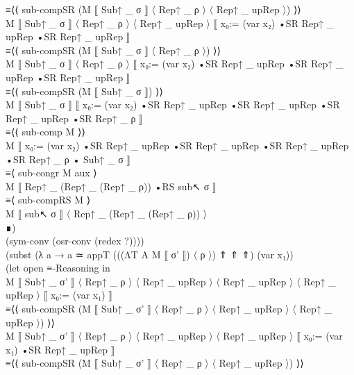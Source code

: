 {\begin{code}
{\>                         ≡⟨⟨ sub-compSR (M ⟦ Sub↑ \_ σ ⟧ 〈 Rep↑ \_ ρ 〉 〈 Rep↑ \_ upRep 〉) ⟩⟩\<\\
\>                           M ⟦ Sub↑ \_ σ ⟧ 〈 Rep↑ \_ ρ 〉 〈 Rep↑ \_ upRep 〉 ⟦ x₀:= (var x₂) •SR Rep↑ \_ upRep •SR Rep↑ \_ upRep ⟧\<\\
\>                         ≡⟨⟨ sub-compSR (M ⟦ Sub↑ \_ σ ⟧ 〈 Rep↑ \_ ρ 〉) ⟩⟩\<\\
\>                           M ⟦ Sub↑ \_ σ ⟧ 〈 Rep↑ \_ ρ 〉 ⟦ x₀:= (var x₂) •SR Rep↑ \_ upRep •SR Rep↑ \_ upRep •SR Rep↑ \_ upRep ⟧\<\\
\>                         ≡⟨⟨ sub-compSR (M ⟦ Sub↑ \_ σ ⟧) ⟩⟩\<\\
\>                           M ⟦ Sub↑ \_ σ ⟧ ⟦ x₀:= (var x₂) •SR Rep↑ \_ upRep •SR Rep↑ \_ upRep •SR Rep↑ \_ upRep •SR Rep↑ \_ ρ ⟧\<\\
\>                         ≡⟨⟨ sub-comp M ⟩⟩\<\\
\>                           M ⟦ x₀:= (var x₂) •SR Rep↑ \_ upRep •SR Rep↑ \_ upRep •SR Rep↑ \_ upRep •SR Rep↑ \_ ρ • Sub↑ \_ σ ⟧\<\\
\>                         ≡⟨ sub-congr M aux ⟩\<\\
\>                           M ⟦ Rep↑ \_ (Rep↑ \_ (Rep↑ \_ ρ)) •RS sub↖ σ ⟧\<\\
\>                         ≡⟨ sub-compRS M ⟩ \<\\
\>                           M ⟦ sub↖ σ ⟧ 〈 Rep↑ \_ (Rep↑ \_ (Rep↑ \_ ρ)) 〉\<\\
\>                           ∎)\<\\
\>                           (sym-conv (osr-conv (redex ?)))) \<\\
\>                         (subst (λ a → a ≃ appT (((ΛT A M ⟦ σ' ⟧) 〈 ρ 〉) ⇑ ⇑ ⇑) (var x₁)) \<\\
\>                           (let open ≡-Reasoning in \<\\
\>                           M ⟦ Sub↑ \_ σ' ⟧ 〈 Rep↑ \_ ρ 〉 〈 Rep↑ \_ upRep 〉 〈 Rep↑ \_ upRep 〉 〈 Rep↑ \_ upRep 〉 ⟦ x₀:= (var x₁) ⟧\<\\
\>                         ≡⟨⟨ sub-compSR (M ⟦ Sub↑ \_ σ' ⟧ 〈 Rep↑ \_ ρ 〉 〈 Rep↑ \_ upRep 〉 〈 Rep↑ \_ upRep 〉) ⟩⟩\<\\
\>                           M ⟦ Sub↑ \_ σ' ⟧ 〈 Rep↑ \_ ρ 〉 〈 Rep↑ \_ upRep 〉 〈 Rep↑ \_ upRep 〉 ⟦ x₀:= (var x₁) •SR Rep↑ \_ upRep ⟧\<\\
\>                         ≡⟨⟨ sub-compSR (M ⟦ Sub↑ \_ σ' ⟧ 〈 Rep↑ \_ ρ 〉 〈 Rep↑ \_ upRep 〉) ⟩⟩\<\\
}
\end{code}}
